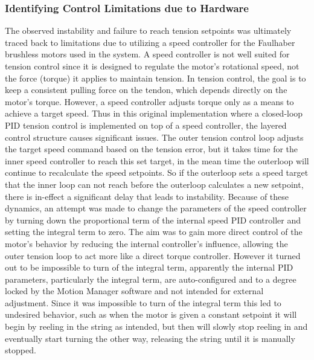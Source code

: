 \subsubsection{Identifying Control Limitations due to Hardware}
The observed instability and failure to reach tension setpoints was ultimately traced back to limitations due to utilizing a speed controller for the Faulhaber brushless motors used in the system. A speed controller is not well suited for tension control since it is designed to regulate the motor's rotational speed, not the force (torque) it applies to maintain tension. In tension control, the goal is to keep a consistent pulling force on the tendon, which depends directly on the motor's torque. However, a speed controller adjusts torque only as a means to achieve a target speed. Thus in this original implementation where a closed-loop PID tension control is implemented on top of a speed controller, the layered control structure causes significant issues. The outer tension control loop adjusts the target speed command based on the tension error, but it takes time for the inner speed controller to reach this set target, in the mean time the outerloop will continue to recalculate the speed setpoints. So if the outerloop sets a speed target that the inner loop can not reach before the outerloop calculates a new setpoint, there is in-effect a significant delay that leads to instability. 
\newline \newline
Because of these dynamics, an attempt was made to change the parameters of the speed controller by turning down the proportional term of the internal speed PID controller and setting the integral term to zero. The aim was to gain more direct control of the motor's behavior by reducing the internal controller's influence, allowing the outer tension loop to act more like a direct torque controller. However it turned out to be impossible to turn of the integral term, apparently the internal PID parameters, particularly the integral term, are auto-configured and to a degree locked by the Motion Manager software and not intended for external adjustment. Since it was impossible to turn of the integral term this led to undesired behavior, such as when the motor is given a constant setpoint it will begin by reeling in the string as intended, but then will slowly stop reeling in and eventually start turning the other way, releasing the string until it is manually stopped. 

